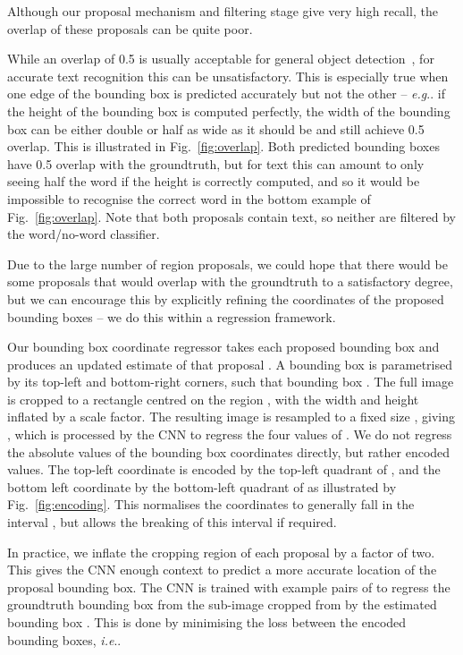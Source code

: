 \documentclass[twocolumn]{svjour3}          \smartqed  \usepackage{epsfig}
\makeatletter
\DeclareRobustCommand\onedot{\futurelet\@let@token\@onedot}
\def\@onedot{\ifx\@let@token.\else.\null\fi\xspace}
\def\eg{\emph{e.g}\onedot} \def\Eg{\emph{E.g}\onedot}
\def\ie{\emph{i.e}\onedot} \def\Ie{\emph{I.e}\onedot}
\makeatother
\begin{document}
Although our proposal mechanism and filtering stage give very high recall, the overlap of these proposals can be quite poor. 

While an overlap of 0.5 is usually acceptable for general object detection~\cite{Everingham10}, for accurate text recognition this can be unsatisfactory. This is especially true when one edge of the bounding box is predicted accurately but not the other -- \eg if the height of the bounding box is computed perfectly, the width of the bounding box can be either double or half as wide as it should be and still achieve 0.5 overlap. This is illustrated in Fig.~\ref{fig:overlap}. Both predicted bounding boxes have 0.5 overlap with the groundtruth, but for text this can amount to only seeing half the word if the height is correctly computed, and so it would be impossible to recognise the correct word in the bottom example of Fig.~\ref{fig:overlap}. Note that both proposals contain text, so neither are filtered by the word/no-word classifier.

Due to the large number of region proposals, we could hope that there would be some proposals that would overlap with the groundtruth to a satisfactory degree, but we can encourage this by explicitly refining the coordinates of the proposed bounding boxes -- we do this within a regression framework. 

Our bounding box coordinate regressor takes each proposed bounding box  and produces an updated estimate of that proposal . A bounding box is parametrised by its top-left and bottom-right corners, such that bounding box . The full image  is cropped to a rectangle centred on the region , with the width and height inflated by a scale factor. The resulting image is resampled to a fixed size , giving , which is processed by the CNN to regress the four values of . We do not regress the absolute values of the bounding box coordinates directly, but rather encoded values. The top-left coordinate is encoded by the top-left quadrant of , and the bottom left coordinate by the bottom-left quadrant of  as illustrated by Fig.~\ref{fig:encoding}. This normalises the coordinates to generally fall in the interval , but allows the breaking of this interval if required.

In practice, we inflate the cropping region of each proposal by a factor of two. This gives the CNN enough context to predict a more accurate location of the proposal bounding box. The CNN is trained with example pairs of  to regress the groundtruth bounding box  from the sub-image  cropped from  by the estimated bounding box . This is done by minimising the  loss between the encoded bounding boxes, \ie 
\end{document}
